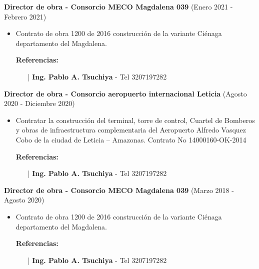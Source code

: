 \documentclass[letterpaper,10pt]{article}
\begin{document}
  \vspace*{0.1cm}
  \textbf{Director de obra - Consorcio MECO Magdalena 039} (Enero 2021 - Febrero 2021)
  \hfill
  \vspace*{0.1cm}
  \begin{minipage}{\linewidth}
    \begin{itemize}[noitemsep]
      \item Contrato de obra 1200 de 2016 construcción de la variante Ciénaga departamento del Magdalena.
      \item [] \textbf{Referencias:}
      \begin{itemize}[noitemsep]
        \vspace*{-0.2cm}
        \item [|] \textbf{Ing. Pablo A. Tsuchiya} - Tel 3207197282
      \end{itemize}
    \end{itemize}
    \hfill
  \end{minipage}

  \vspace*{0.1cm}
  \textbf{Director de obra - Consorcio aeropuerto internacional Leticia} (Agosto 2020 - Diciembre 2020)
  \hfill
  \vspace*{0.1cm}
  \begin{minipage}{\linewidth}
    \begin{itemize}[noitemsep]
      \item Contratar la construcción del terminal, torre de control, Cuartel de Bomberos y obras de infraestructura complementaria del Aeropuerto Alfredo Vasquez Cobo de la ciudad de Leticia – Amazonas. Contrato No 14000160-OK-2014
      \item [] \textbf{Referencias:}
      \begin{itemize}[noitemsep]
        \vspace*{-0.2cm}
        \item [|] \textbf{Ing. Pablo A. Tsuchiya} - Tel 3207197282
      \end{itemize}
    \end{itemize}
    \hfill
  \end{minipage}
 
  \vspace*{0.1cm}
  \textbf{Director de obra - Consorcio MECO Magdalena 039} (Marzo 2018 - Agosto 2020)
  \hfill
  \vspace*{0.1cm}
  \begin{minipage}{\linewidth}
    \begin{itemize}[noitemsep]
      \item Contrato de obra 1200 de 2016 construcción de la variante Ciénaga departamento del Magdalena.
      \item [] \textbf{Referencias:}
      \begin{itemize}[noitemsep]
        \vspace*{-0.2cm}
        \item [|] \textbf{Ing. Pablo A. Tsuchiya} - Tel 3207197282
      \end{itemize}
    \end{itemize}
    \hfill
  \end{minipage}
 
\end{document}
